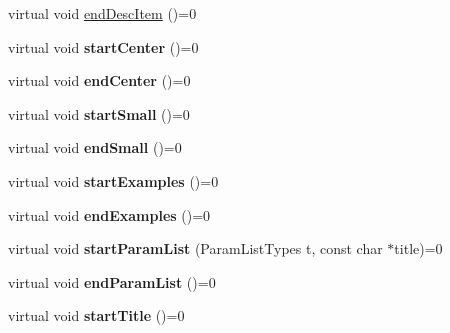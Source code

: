 \begin{DoxyCompactItemize}
\item 
virtual void \mbox{\hyperlink{class_base_output_doc_interface_a09e3aa9d3faac55b2cc9290eaa69f55b}{end\+Desc\+Item}} ()=0
\item 
\mbox{\label{class_base_output_doc_interface_af7740896d897da2924e8d8818858edd1}} 
virtual void {\bfseries start\+Center} ()=0
\item 
\mbox{\label{class_base_output_doc_interface_aacbcdb867519fce8db354460566aa4ea}} 
virtual void {\bfseries end\+Center} ()=0
\item 
\mbox{\label{class_base_output_doc_interface_aa48fb5d720aabf2dc67d866b9861f733}} 
virtual void {\bfseries start\+Small} ()=0
\item 
\mbox{\label{class_base_output_doc_interface_aece1c56c3a382b5e7228f034e600b43f}} 
virtual void {\bfseries end\+Small} ()=0
\item 
\mbox{\label{class_base_output_doc_interface_aa61b180f670584de7e584d0e54bc85f3}} 
virtual void {\bfseries start\+Examples} ()=0
\item 
\mbox{\label{class_base_output_doc_interface_a1b3eca2ad781699cb342f4e7f389a6d2}} 
virtual void {\bfseries end\+Examples} ()=0
\item 
\mbox{\label{class_base_output_doc_interface_a0fe360d170bf70af8455d521ecad8cab}} 
virtual void {\bfseries start\+Param\+List} (Param\+List\+Types t, const char $\ast$title)=0
\item 
\mbox{\label{class_base_output_doc_interface_a2e18469ef7e3f144e05d7713efaa9aac}} 
virtual void {\bfseries end\+Param\+List} ()=0
\item 
\mbox{\label{class_base_output_doc_interface_a52507f4f611800062e6776704d3c0eaf}} 
virtual void {\bfseries start\+Title} ()=0
\item 
\mbox{\label{class_base_output_doc_interface_a5dee56a3a18bafb23c30f42e6575210f}} 

\end{DoxyCompactItemize}
